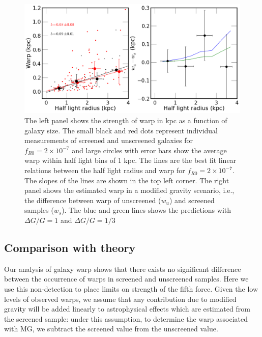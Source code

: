 \documentclass[useAMS,usenatbib,twocolumn]{mn2e}
\begin{document}
\begin{figure}
\begin{center}
\includegraphics[scale=0.43]{figures/size-warpness-kpc.png}
\caption{The left panel shows the strength of warp in kpc as a function of
galaxy size. The small black and red dots
represent individual measurements of screened and unscreened galaxies for
$f_{R0} = 2 \times10^{-7}$  and large circles
with error bars show the average warp within half light bins of 1 kpc.  The
lines are the best fit linear relations between
the half light radius and warp for $f_{R0} = 2 \times10^{-7}$. The slopes of
the lines are shown in the top left corner. The right panel shows the estimated
warp in a modified gravity scenario, i.e., the difference between warp
of unscreened
($w_u$) and screened samples ($w_s$). The blue and green lines shows the
predictions with $\Delta G/G = 1$ and $\Delta G/G = 1/3$}
\label{fig:size-warp-kpc}
\end{center}
\end{figure}

\subsection{Comparison with theory}
Our analysis of galaxy warp shows that there exists no significant
difference between the occurrence of warps in screened and unscreened
samples. Here we use this non-detection to place 
limits on strength of the fifth force. Given the low levels of observed warps, 
we assume that any contribution 
due to modified gravity will be added linearly to astrophysical effects
which are estimated from the screened sample: under this assumption, to
determine the warp associated with MG, we subtract the screened value from
the unscreened value.
\end{document}
